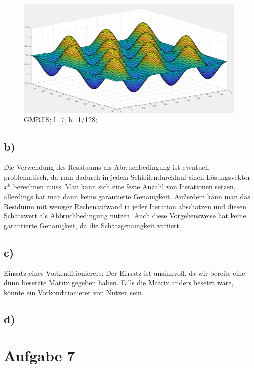 \documentclass{article}
\begin{document}
\begin{figure}
	\includegraphics[width=\linewidth]{Aufgaben-Ressourcen/A6L7M3N2.png}
		\caption{GMRES; l=7; h=1/128;}
		\label{A6L7}
\end{figure}
	\subsection{b)}
	Die Verwendung des Residuums als Abrruchbedingung ist eventuell problematisch, da man dadurch in jedem Schleifendurchlauf einen Lösungsvektor $x^k$ berechnen muss. Man kann sich eine feste Anzahl von Iterationen setzen, allerdings hat man dann keine garantierte Genauigkeit. Außerdem kann man das Residuum mit weniger Rechenaufwand in jeder Iteration abschätzen und diesen Schätzwert als Abbruchbedingung nutzen. Auch diese Vorgehensweise hat keine garantierte Genauigkeit, da die Schätzgenauigkeit variiert.
	\subsection{c)}

Einsatz eines Vorkonditionierers: Der Einsatz ist unsinnvoll, da wir bereits eine dünn besetzte Matrix gegeben haben. Falls die Matrix anders besetzt wäre, könnte ein Vorkonditionierer von Nutzen sein.
	\subsection{d)}
\section{Aufgabe 7}
\end{document}
